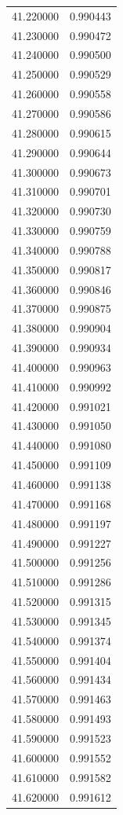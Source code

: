 \begin{tabular}{rr}
41.220000 & 0.990443 \\
41.230000 & 0.990472 \\
41.240000 & 0.990500 \\
41.250000 & 0.990529 \\
41.260000 & 0.990558 \\
41.270000 & 0.990586 \\
41.280000 & 0.990615 \\
41.290000 & 0.990644 \\
41.300000 & 0.990673 \\
41.310000 & 0.990701 \\
41.320000 & 0.990730 \\
41.330000 & 0.990759 \\
41.340000 & 0.990788 \\
41.350000 & 0.990817 \\
41.360000 & 0.990846 \\
41.370000 & 0.990875 \\
41.380000 & 0.990904 \\
41.390000 & 0.990934 \\
41.400000 & 0.990963 \\
41.410000 & 0.990992 \\
41.420000 & 0.991021 \\
41.430000 & 0.991050 \\
41.440000 & 0.991080 \\
41.450000 & 0.991109 \\
41.460000 & 0.991138 \\
41.470000 & 0.991168 \\
41.480000 & 0.991197 \\
41.490000 & 0.991227 \\
41.500000 & 0.991256 \\
41.510000 & 0.991286 \\
41.520000 & 0.991315 \\
41.530000 & 0.991345 \\
41.540000 & 0.991374 \\
41.550000 & 0.991404 \\
41.560000 & 0.991434 \\
41.570000 & 0.991463 \\
41.580000 & 0.991493 \\
41.590000 & 0.991523 \\
41.600000 & 0.991552 \\
41.610000 & 0.991582 \\
41.620000 & 0.991612 \\

\end{tabular}
